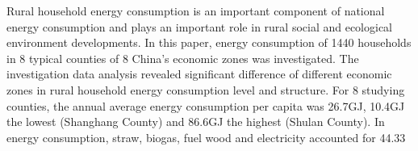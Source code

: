 Rural household energy consumption is an important component of national energy consumption and plays an important role in rural social and ecological environment developments. In this paper, energy consumption of 1440 households in 8 typical counties of 8 China's economic zones was investigated. The investigation data analysis revealed significant difference of different economic zones in rural household energy consumption level and structure. For 8 studying counties, the annual average energy consumption per capita was 26.7GJ, 10.4GJ the lowest (Shanghang County) and 86.6GJ the highest (Shulan County). In energy consumption, straw, biogas, fuel wood and electricity accounted for 44.33%